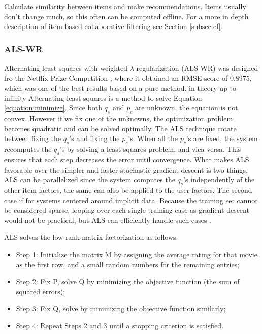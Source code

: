 Calculate similarity between items and make recommendations. Items usually don't change much, so this often can be computed offline. For a more in depth description of item-based collaborative filtering see Section \ref{subsec:cf}.%

\subsubsection{ALS-WR}


Alternating-least-squares with weighted-$\lambda$-regularization (ALS-WR) was designed fro the Netflix Prize Competition \cite{Netflix}, where it obtained an RMSE score of 0.8975, which was one of the best results based on a pure method.
in theory up to infinity
Alternating-least-squares is a method to solve Equation \ref{equation:minimize}. Since both $q_{s}$ and $p_{c}$ are unknown, the equation is not convex. However if we fix one of the unknowns, the optimization problem becomes quadratic and can be solved optimally. The ALS technique rotate between fixing the $q_{s}$'s and fixing the $p_{c}$'s. When all the $p_{c}$'s are fixed, the system recomputes the $q_{s}$'s by solving a least-squares problem, and vica versa. This ensures that each step decreases the error until convergence. What makes ALS favorable over the simpler and faster stochastic gradient descent is two things. ALS can be parallelized since the system computes the $q_{s}$'s independently of the other item factors, the same can also be applied to the user factors. The second case if for systems centered around implicit data. Because the training set cannot be considered sparse, looping over each single training case as gradient descent would not be practical, but ALS can efficiently handle such cases \cite{Hu2008}.\newline

ALS solves the low-rank matrix factorization as follows:

\begin{itemize}
\item Step 1: Initialize the matrix M by assigning the average rating for that movie as the first row, and a small random numbers for the remaining entries;
\item Step 2: Fix P, solve Q by minimizing the objective function (the sum of squared errors);
\item Step 3: Fix Q, solve by minimizing the objective function similarly;
\item Step 4: Repeat Steps 2 and 3 until a stopping criterion is satisfied.
\end{itemize}

